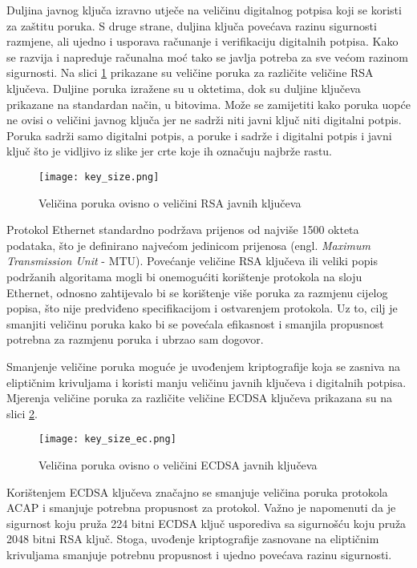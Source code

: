 Duljina javnog ključa izravno utječe na veličinu digitalnog potpisa koji se
koristi za zaštitu poruka. S druge strane, duljina ključa povećava razinu
sigurnosti razmjene, ali ujedno i usporava računanje i verifikaciju digitalnih
potpisa. Kako se razvija i napreduje računalna moć tako se javlja potreba za sve
većom razinom sigurnosti. Na slici \ref{fig:key_size} prikazane su veličine
poruka za različite veličine RSA ključeva. Duljine poruka izražene su u
oktetima, dok su duljine ključeva prikazane na standardan način, u bitovima.
Može se zamijetiti kako
poruka \initi{} uopće ne ovisi o veličini javnog ključa jer ne sadrži niti javni
ključ niti digitalni potpis. Poruka \listr{} sadrži samo digitalni potpis, a
poruke \initr{} i \listi{} sadrže i digitalni potpis i javni ključ što je
vidljivo iz slike jer crte koje ih označuju najbrže rastu.

\begin{figure}[h]
    \centering
    \texttt{[image: key\_size.png]}
    \caption{Veličina poruka ovisno o veličini RSA javnih ključeva}
    \label{fig:key_size}
\end{figure}

Protokol Ethernet standardno podržava prijenos od najviše 1500 okteta podataka,
što je definirano najvećom jedinicom prijenosa (engl. \emph{Maximum
Transmission Unit} - MTU). Povećanje veličine RSA ključeva ili veliki popis podržanih
algoritama mogli bi onemogućiti korištenje protokola na sloju
Ethernet, odnosno zahtijevalo bi se
korištenje više poruka za razmjenu cijelog popisa, što nije predviđeno
specifikacijom i ostvarenjem protokola. Uz to, cilj je smanjiti veličinu
poruka kako bi se
povećala efikasnost i smanjila propusnost potrebna za razmjenu poruka i ubrzao
sam dogovor.

Smanjenje veličine poruka moguće je uvođenjem kriptografije koja se zasniva na
eliptičnim krivuljama i koristi manju veličinu javnih ključeva i digitalnih
potpisa. Mjerenja veličine poruka za različite veličine ECDSA ključeva
prikazana su na slici \ref{fig:key_size_ec}. 

\begin{figure}[h]
    \centering
    \texttt{[image: key\_size\_ec.png]}
    \caption{Veličina poruka ovisno o veličini ECDSA javnih ključeva}
    \label{fig:key_size_ec}
\end{figure}

Korištenjem ECDSA ključeva značajno se smanjuje veličina poruka protokola ACAP i
smanjuje potrebna propusnost za protokol. Važno je napomenuti da je
sigurnost koju pruža 224 bitni ECDSA ključ usporediva sa sigurnošću koju pruža
2048 bitni RSA ključ. Stoga, uvođenje kriptografije zasnovane na eliptičnim
krivuljama smanjuje potrebnu propusnost i ujedno povećava razinu sigurnosti.

